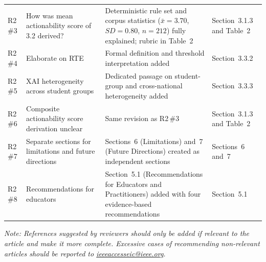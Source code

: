 \documentclass[12pt, a4paper]{article}
\begin{document}
\begin{longtable}{p{1.2cm} p{3.3cm} p{4.0cm} p{5.5cm}}
R2\,\#3 & How was mean actionability score of 3.2 derived?
         & Deterministic rule set and corpus statistics ($\bar{x}=3.70$, $SD=0.80$, $n=212$)
           fully explained; rubric in Table~2
         & Section~3.1.3 and Table~2 \\

R2\,\#4 & Elaborate on RTE
         & Formal definition and threshold interpretation added
         & Section~3.3.2 \\

R2\,\#5 & XAI heterogeneity across student groups
         & Dedicated passage on student-group and cross-national heterogeneity added
         & Section~3.3.3 \\

R2\,\#6 & Composite actionability score derivation unclear
         & Same revision as R2\,\#3
         & Section~3.1.3 and Table~2 \\

R2\,\#7 & Separate sections for limitations and future directions
         & Sections~6 (Limitations) and~7 (Future Directions) created as independent sections
         & Sections~6 and~7 \\

R2\,\#8 & Recommendations for educators
         & Section~5.1 (Recommendations for Educators and Practitioners) added with four
           evidence-based recommendations
         & Section~5.1 \\

\bottomrule
\end{longtable}

\bigskip\noindent\textit{Note: References suggested by reviewers should only be added if relevant
to the article and make it more complete. Excessive cases of recommending non-relevant articles
should be reported to \href{mailto:ieeeaccesseic@ieee.org}{ieeeaccesseic@ieee.org}.}
\end{document}
